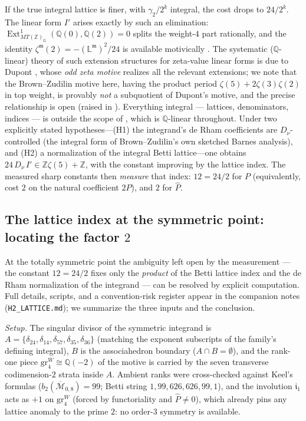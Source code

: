 \documentclass[11pt]{article}
\theoremstyle{definition}
\newcommand{\Dnu}{D_{\nu}}
\newcommand{\Z}{\mathbb{Z}}
\newcommand{\Q}{\mathbb{Q}}
\begin{document}
If the true integral lattice is finer, with $\gamma_2/2^k$ integral, the
cost drops to $24/2^k$. The linear form $I'$ arises exactly by such an
elimination: $\operatorname{Ext}^1_{MT(\Z)_\Q}(\Q(0),\Q(2))=0$
\cite{BrownMTZ} splits the weight-$4$ part rationally, and the identity
$\zeta^{\mathfrak m}(2)=-(\mathbb L^{\mathfrak m})^2/24$ is available
motivically \cite[\S2.2]{BrownP1}. The systematic ($\Q$-linear) theory
of such extension structures for zeta-value linear forms is due to
Dupont \cite[\S1.2, Thms.~1.3--1.4]{Dupont}, whose \emph{odd zeta
motive} realizes all the relevant extensions; we note that the
Brown--Zudilin motive here, having the product period
$\zeta(5)+2\zeta(3)\zeta(2)$ in top weight, is provably \emph{not} a
subquotient of Dupont's motive, and the precise relationship is open
(raised in \cite{Dupont}). Everything integral --- lattices,
denominators, indices --- is outside the scope of \cite{Dupont}, which
is $\Q$-linear throughout. Under two explicitly stated
hypotheses---(H1) the integrand's de Rham coefficients are
$\Dnu$-controlled (the integral form of Brown--Zudilin's own sketched
Barnes analysis), and (H2) a normalization of the integral Betti
lattice---one obtains $24\,\Dnu\,I'\in\Z\zeta(5)+\Z$, with the constant
improving by the lattice index. The measured sharp constants then
\emph{measure} that index: $12=24/2$ for $P$ (equivalently, cost $2$ on
the natural coefficient $2P$), and $2$ for $\hat P$.

\subsection{The lattice index at the symmetric point: locating the
factor $2$}\label{sec:p2}

At the totally symmetric point the ambiguity left open by the
measurement --- the constant $12=24/2$ fixes only the \emph{product} of
the Betti lattice index and the de Rham normalization of the integrand
--- can be resolved by explicit computation. Full details, scripts, and
a convention-risk register appear in the companion notes
(\texttt{H2\_LATTICE.md}); we summarize the three inputs and the
conclusion.

\emph{Setup.} The singular divisor of the symmetric integrand is
$A=\{\delta_{24},\delta_{14},\delta_{57},\delta_{35},
\delta_{36}\}$ (matching the exponent subscripts of the family's
defining integral), $B$ is the associahedron boundary
($A\cap B=\emptyset$), and the rank-one piece
$\mathrm{gr}^W_4\cong\Q(-2)$ of the motive is carried by the seven
transverse codimension-$2$ strata inside $A$. Ambient ranks were
cross-checked against Keel's formulas ($b_2(\overline{\mathcal
M}_{0,8})=99$; Betti string $1,99,626,626,99,1$), and the involution
$\mathfrak i_1$ acts as $+1$ on $\mathrm{gr}^W_4$ (forced by
functoriality and $\hat P\neq0$), which already pins any lattice
anomaly to the prime $2$: no order-$3$ symmetry is available.
\end{document}
